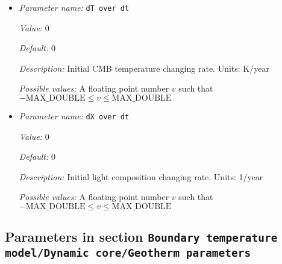 \begin{itemize}
{\it Value:} 0


{\it Default:} 0


{\it Description:} Initial inner core radius changing rate. Units: km/year


{\it Possible values:} A floating point number $v$ such that $-\text{MAX\_DOUBLE} \leq v \leq \text{MAX\_DOUBLE}$
\item {\it Parameter name:} {\tt dT over dt}
\label{parameters:Boundary temperature model/Dynamic core/dT over dt}


{\it Value:} 0


{\it Default:} 0


{\it Description:} Initial CMB temperature changing rate. Units: K/year


{\it Possible values:} A floating point number $v$ such that $-\text{MAX\_DOUBLE} \leq v \leq \text{MAX\_DOUBLE}$
\item {\it Parameter name:} {\tt dX over dt}
\label{parameters:Boundary temperature model/Dynamic core/dX over dt}


{\it Value:} 0


{\it Default:} 0


{\it Description:} Initial light composition changing rate. Units: 1/year


{\it Possible values:} A floating point number $v$ such that $-\text{MAX\_DOUBLE} \leq v \leq \text{MAX\_DOUBLE}$
\end{itemize}



\subsection{Parameters in section \tt Boundary temperature model/Dynamic core/Geotherm parameters}
\label{parameters:Boundary_20temperature_20model/Dynamic_20core/Geotherm_20parameters}

